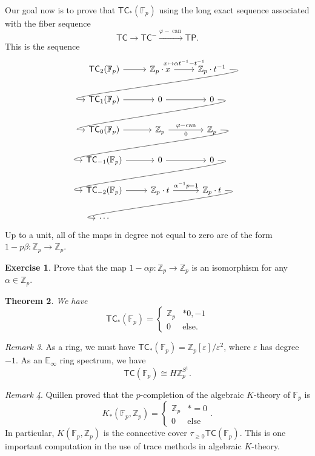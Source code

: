 \documentclass[10pt, oneside]{memoir}
\newtheorem{thm}{Theorem}[subsection]
\theoremstyle{definition}
\newtheorem{exer}[thm]{Exercise}
\theoremstyle{remark}
\newtheorem{rmk}[thm]{Remark}
\theoremstyle{plain}
\theoremstyle{definition}
\theoremstyle{remark}
\newcommand{\Z}{\mathbb{Z}}
\newcommand{\E}{\mathbb{E}}
\newcommand{\F}{\mathbb{F}}
\newcommand{\ep}{\varepsilon}
\newcommand{\on}[1]{\operatorname{#1}}
\newcommand{\ms}[1]{\mathsf{#1}}
\newcommand{\1}{\mathbf{1}}
\newcommand{\2}{\mathbf{2}}
\newcommand{\3}{\mathbf{3}}
\newcommand{\TC}{\ms{TC}}
\newcommand{\TP}{\ms{TP}}
\begin{document}
Our goal now is to prove that \(\TC_*(\F_p) \) using the long exact sequence associated with the fiber sequence
\[ \TC \to \TC^- \xrightarrow{\varphi - \on{can}} \TP. \]
This is the sequence
\begin{equation*}
\begin{tikzcd}
    \TC_2(\F_p) \ar{r} & \Z_p \cdot x \arrow[r, "x \mapsto \alpha t^{-1} - t^{-1}" {yshift=2pt}] & \Z_p \cdot t^{-1} \arrow[out=0,in=180, looseness=1]{dll} \\
    \TC_1(\F_p) \ar{r} & 0 \ar{r} & 0 \arrow[out=0,in=180, looseness=1]{dll} \\
    \TC_0(\F_p) \ar{r} & \Z_p \ar{r}{\varphi-\on{can}}[swap]{0} & \Z_p \arrow[out=0, in=180, looseness=1]{dll} \\
    \TC_{-1}(\F_p) \ar{r} & 0 \ar{r} & 0 \arrow[out=0,in=180, looseness=1]{dll} \\
    \TC_{-2}(\F_p) \ar{r} & \Z_p \cdot t \ar{r}{\alpha^{-1}p-1} & \Z_p \cdot t \arrow[out=0,in=180, looseness=1]{dll} \\
    \cdots
\end{tikzcd}
\end{equation*}
Up to a unit, all of the maps in degree not equal to zero are of the form \(1-p \beta \colon \Z_p \to \Z_p \).

\begin{exer}
    Prove that the map \(1-\alpha p \colon \Z_p \to \Z_p \) is an isomorphism for any \(\alpha \in \Z_p \).
\end{exer}

\begin{thm}
    We have
    \[ \TC_*(\F_p) = \begin{cases}
        \Z_p & * 0, -1 \\
        0 & \text{else}.
    \end{cases} \]
\end{thm}

\begin{rmk}
    As a ring, we must have \(\TC_*(\F_p) = \Z_p[\ep]/\ep^2 \), where \(\ep \) has degree \(-1 \). As an \(\E_{\infty} \) ring spectrum, we have
    \[ \TC(\F_p) \cong H\Z_p^{S^1}. \]
\end{rmk}

\begin{rmk}
    Quillen proved that the \(p \)-completion of the algebraic \(K \)-theory of \(\F_p \) is
    \[ K_*(\F_p, \Z_p) = \begin{cases}
        \Z_p & *=0 \\
        0 & \text{else}
    \end{cases}. \]
    In particular, \(K(\F_p, \Z_p) \) is the connective cover \(\tau_{\geq 0} \TC(\F_p) \). This is one important computation in the use of trace methods in algebraic \(K \)-theory.
\end{rmk}
\end{document}

